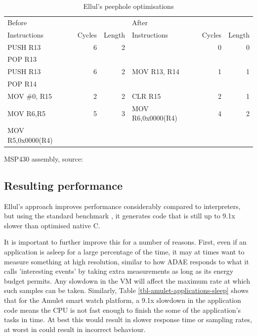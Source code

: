 \begin{table}
\caption{Ellul's peephole optimisations}
\label{tbl-ellul-peephole}
    \begin{threeparttable}
    \begin{tabular}{lrrlrr} %
    \toprule
    Before            &        &        & After             &        & \\
    Instructions      & Cycles & Length & Instructions      & Cycles & Length \\
    \midrule
    \midrule
    PUSH R13          & 6      & 2      &                   & 0      & 0 \\
    POP R13           &        &        &                   &        & \\
    \midrule
    PUSH R13          & 6      & 2      & MOV R13, R14      & 1      & 1 \\
    POP R14           &        &        &                   &        & \\
    \midrule
    MOV \#0, R15      & 2      & 2      & CLR R15           & 2      & 1 \\
    \midrule
    MOV R6,R5         & 5      & 3      & MOV R6,0x0000(R4) & 4      & 2 \\
    MOV R5,0x0000(R4) &        &        &                   &        & \\
    \bottomrule
    \end{tabular}
    \begin{tablenotes}
    \item MSP430 assembly, source: \cite{Ellul:2012thesis}
    \end{tablenotes}
    \end{threeparttable}
\end{table}

\subsection{Resulting performance}
Ellul's approach improves performance considerably compared to interpreters, but using the standard  benchmark \cite{coremark}, it generates code that is still up to 9.1x slower than optimised native C.

It is important to further improve this for a number of reasons. First, even if an application is asleep for a large percentage of the time, it may at times want to measure something at high resolution, similar to how ADAE \cite{Chang:2010ek} responds to what it calls 'interesting events' by taking extra measurements as long as its energy budget permits. Any slowdown in the VM will affect the maximum rate at which such samples can be taken. Similarly, Table \ref{tbl-amulet-applications-sleep} shows that for the Amulet smart watch platform, a 9.1x slowdown in the application code means the CPU is not fast enough to finish the some of the application's tasks in time. At best this would result in slower response time or sampling rates, at worst in could result in incorrect behaviour.

